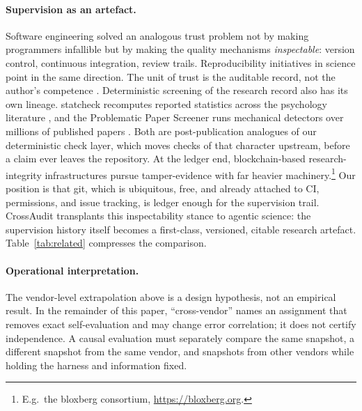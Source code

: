 \documentclass[11pt]{article}
\begin{document}
\paragraph{Supervision as an artefact.} Software engineering solved an analogous trust problem not by making programmers infallible but by making the quality mechanisms \emph{inspectable}: version control, continuous integration, review trails. Reproducibility initiatives in science point in the same direction. The unit of trust is the auditable record, not the author's competence \cite{baker2016}. Deterministic screening of the research record also has its own lineage. statcheck recomputes reported statistics across the psychology literature \cite{nuijten2016statcheck}, and the Problematic Paper Screener runs mechanical detectors over millions of published papers \cite{cabanac2022pps}. Both are post-publication analogues of our deterministic check layer, which moves checks of that character upstream, before a claim ever leaves the repository. At the ledger end, blockchain-based research-integrity infrastructures pursue tamper-evidence with far heavier machinery.\footnote{E.g.\ the bloxberg consortium, \url{https://bloxberg.org}.} Our position is that git, which is ubiquitous, free, and already attached to CI, permissions, and issue tracking, is ledger enough for the supervision trail. CrossAudit transplants this inspectability stance to agentic science: the supervision history itself becomes a first-class, versioned, citable research artefact. Table~\ref{tab:related} compresses the comparison.

\paragraph{Operational interpretation.} The vendor-level extrapolation above is a design hypothesis, not an empirical result. In the remainder of this paper, ``cross-vendor'' names an assignment that removes exact self-evaluation and may change error correlation; it does not certify independence. A causal evaluation must separately compare the same snapshot, a different snapshot from the same vendor, and snapshots from other vendors while holding the harness and information fixed.

\end{document}
